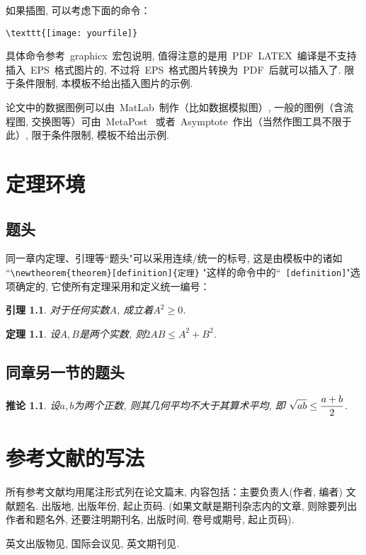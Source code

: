 \documentclass[notitlepage,cs4size,punct,oneside]{ctexrep}
\numberwithin{equation}{chapter}
\theoremstyle{mystyle}
\newtheorem{theorem}[definition]{\hspace{2em}定理}
\newtheorem{lemma}[definition]{\hspace{2em}引理}
\newtheorem{corollary}[definition]{\hspace{2em}推论}
\begin{document}
如果插图, 可以考虑下面的命令：
\begin{verbatim}
\texttt{[image: yourfile]}
\end{verbatim}
具体命令参考~graphicx~宏包说明,
值得注意的是用~PDF\, LATEX~编译是不支持插入~EPS~格式图片的,
不过将~EPS~格式图片转换为~PDF~后就可以插入了. 限于条件限制, 本模板不给出插入图片的示例.
\par
论文中的数据图例可以由~MatLab~制作（比如数据模拟图）,
一般的图例（含流程图, 交换图等）可由~MetaPost~
或者~Asymptote~作出（当然作图工具不限于此）, 限于条件限制,
模板不给出示例.

\chapter{定理环境}

\section{题头}
同一章内定理、引理等``题头"可以采用连续/统一的标号, 这是由模板中的诸如
``\verb+\newtheorem{theorem}[definition]{定理}+ "这样的命令中的``\verb+ [definition]+"选项确定的, 它使所有定理采用和定义统一编号：
\begin{lemma}\label{L1} 对于任何实数$A$, 成立着$A^2\geq 0$.
\end{lemma}


\begin{theorem}\label{T1} 设$A,B$是两个实数, 则$2AB\leq A^2+B^2$.
\end{theorem}

\section{同章另一节的题头}

\begin{corollary}\label{P1} 设$a,b$为两个正数, 则其几何平均不大于其算术平均, 即
$\displaystyle \sqrt{ab}\leq {a+b\over 2}$.
\end{corollary}

\chapter{参考文献的写法}

所有参考文献均用尾注形式列在论文篇末, 内容包括：主要负责人(作者,
编者) 文献题名. 出版地, 出版年份, 起止页码.
(如果文献是期刊杂志内的文章, 则除要列出作者和题名外, 还要注明期刊名,
出版时间, 卷号或期号, 起止页码).

英文出版物见\cite{HTF}, 国际会议见\cite{ZhangC},
英文期刊见\cite{ChenSX}.
\end{document}
